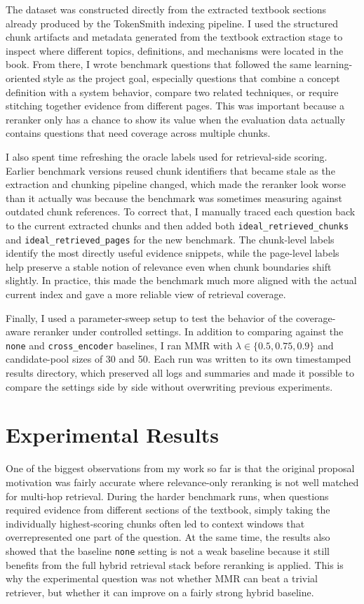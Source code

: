 \documentclass[sigconf]{acmart}
\begin{document}
The dataset was constructed directly from the extracted textbook sections already produced by the TokenSmith indexing pipeline. I used the structured chunk artifacts and metadata generated from the textbook extraction stage to inspect where different topics, definitions, and mechanisms were located in the book. From there, I wrote benchmark questions that followed the same learning-oriented style as the project goal, especially questions that combine a concept definition with a system behavior, compare two related techniques, or require stitching together evidence from different pages. This was important because a reranker only has a chance to show its value when the evaluation data actually contains questions that need coverage across multiple chunks.

I also spent time refreshing the oracle labels used for retrieval-side scoring. Earlier benchmark versions reused chunk identifiers that became stale as the extraction and chunking pipeline changed, which made the reranker look worse than it actually was because the benchmark was sometimes measuring against outdated chunk references. To correct that, I manually traced each question back to the current extracted chunks and then added both \texttt{ideal\_retrieved\_chunks} and \texttt{ideal\_retrieved\_pages} for the new benchmark. The chunk-level labels identify the most directly useful evidence snippets, while the page-level labels help preserve a stable notion of relevance even when chunk boundaries shift slightly. In practice, this made the benchmark much more aligned with the actual current index and gave a more reliable view of retrieval coverage.

Finally, I used a parameter-sweep setup to test the behavior of the coverage-aware reranker under controlled settings. In addition to comparing against the \texttt{none} and \texttt{cross\_encoder} baselines, I ran MMR with \(\lambda \in \{0.5, 0.75, 0.9\}\) and candidate-pool sizes of 30 and 50. Each run was written to its own timestamped results directory, which preserved all logs and summaries and made it possible to compare the settings side by side without overwriting previous experiments.

\section{Experimental Results}
One of the biggest observations from my work so far is that the original proposal motivation was fairly accurate where relevance-only reranking is not well matched for multi-hop retrieval. During the harder benchmark runs, when questions required evidence from different sections of the textbook, simply taking the individually highest-scoring chunks often led to context windows that overrepresented one part of the question. At the same time, the results also showed that the baseline \texttt{none} setting is not a weak baseline because it still benefits from the full hybrid retrieval stack before reranking is applied. This is why the experimental question was not whether MMR can beat a trivial retriever, but whether it can improve on a fairly strong hybrid baseline.
\end{document}
